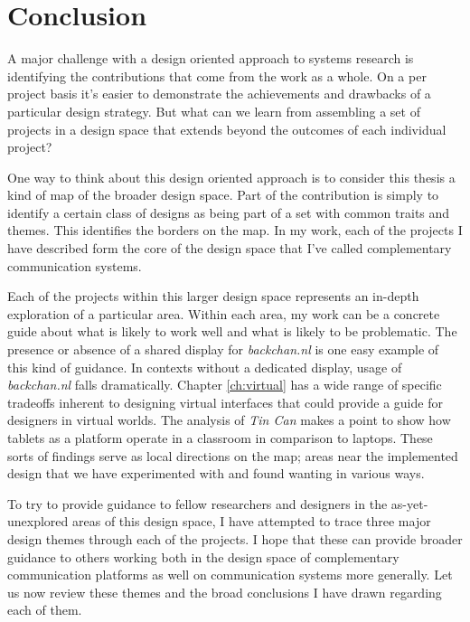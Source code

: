 \chapter{Conclusion}

A major challenge with a design oriented approach to systems research is identifying the contributions that come from the work as a whole. On a per project basis it's easier to demonstrate the achievements and drawbacks of a particular design strategy. But what can we learn from assembling a set of projects in a design space that extends beyond the outcomes of each individual project?

One way to think about this design oriented approach is to consider this thesis a kind of map of the broader design space. Part of the contribution is simply to identify a certain class of designs as being part of a set with common traits and themes. This identifies the borders on the map. In my work, each of the projects I have described form the core of the design space that I've called complementary communication systems. 

Each of the projects within this larger design space represents an in-depth exploration of a particular area. Within each area, my work can be a concrete guide about what is likely to work well and what is likely to be problematic. The presence or absence of a shared display for \emph{backchan.nl} is one easy example of this kind of guidance. In contexts without a dedicated display, usage of \emph{backchan.nl} falls dramatically. Chapter \ref{ch:virtual} has a wide range of specific tradeoffs inherent to designing virtual interfaces that could provide a guide for designers in virtual worlds. The analysis of \emph{Tin Can} makes a point to show how tablets as a platform operate in a classroom in comparison to laptops. These sorts of findings serve as local directions on the map; areas near the implemented design that we have experimented with and found wanting in various ways.

To try to provide guidance to fellow researchers and designers in the as-yet-unexplored areas of this design space, I have attempted to trace three major design themes through each of the projects. I hope that these can provide broader guidance to others working both in the design space of complementary communication platforms as well on communication systems more generally. Let us now review these themes and the broad conclusions I have drawn regarding each of them.



